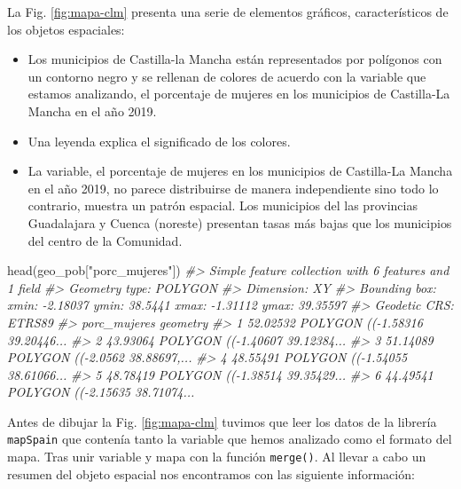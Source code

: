 \documentclass[
]{book}
\newenvironment{Shaded}{\begin{snugshade}}{\end{snugshade}}
\newcommand{\CommentTok}[1]{\textcolor[rgb]{0.56,0.35,0.01}{\textit{#1}}}
\newcommand{\FunctionTok}[1]{\textcolor[rgb]{0.00,0.00,0.00}{#1}}
\newcommand{\NormalTok}[1]{#1}
\newcommand{\StringTok}[1]{\textcolor[rgb]{0.31,0.60,0.02}{#1}}
\begin{document}
La Fig. \ref{fig:mapa-clm} presenta una serie de elementos gráficos,
característicos de los objetos espaciales:

\begin{itemize}
\item
  Los municipios de Castilla-la Mancha están representados por polígonos con
  un contorno negro y se rellenan de colores de acuerdo con la variable que
  estamos analizando, el porcentaje de mujeres en los municipios de
  Castilla-La Mancha en el año 2019.
\item
  Una leyenda explica el significado de los colores.
\item
  La variable, el porcentaje de mujeres en los municipios de Castilla-La
  Mancha en el año 2019, no parece distribuirse de manera independiente sino
  todo lo contrario, muestra un patrón espacial. Los municipios del las
  provincias Guadalajara y Cuenca (noreste) presentan tasas más bajas que los
  municipios del centro de la Comunidad.
\end{itemize}

\begin{Shaded}
\begin{Highlighting}[]
\FunctionTok{head}\NormalTok{(geo\_pob[}\StringTok{"porc\_mujeres"}\NormalTok{])}
\CommentTok{\#\textgreater{} Simple feature collection with 6 features and 1 field}
\CommentTok{\#\textgreater{} Geometry type: POLYGON}
\CommentTok{\#\textgreater{} Dimension:     XY}
\CommentTok{\#\textgreater{} Bounding box:  xmin: {-}2.18037 ymin: 38.5441 xmax: {-}1.31112 ymax: 39.35597}
\CommentTok{\#\textgreater{} Geodetic CRS:  ETRS89}
\CommentTok{\#\textgreater{}   porc\_mujeres                       geometry}
\CommentTok{\#\textgreater{} 1     52.02532 POLYGON (({-}1.58316 39.20446...}
\CommentTok{\#\textgreater{} 2     43.93064 POLYGON (({-}1.40607 39.12384...}
\CommentTok{\#\textgreater{} 3     51.14089 POLYGON (({-}2.0562 38.88697,...}
\CommentTok{\#\textgreater{} 4     48.55491 POLYGON (({-}1.54055 38.61066...}
\CommentTok{\#\textgreater{} 5     48.78419 POLYGON (({-}1.38514 39.35429...}
\CommentTok{\#\textgreater{} 6     44.49541 POLYGON (({-}2.15635 38.71074...}
\end{Highlighting}
\end{Shaded}

Antes de dibujar la Fig. \ref{fig:mapa-clm} tuvimos que leer los datos de la
librería \texttt{mapSpain} \citep{rmapspain} que contenía tanto la variable que hemos
analizado como el formato del mapa. Tras unir variable y mapa con la función
\texttt{merge()}. Al llevar a cabo un resumen del objeto espacial nos encontramos con
las siguiente información:
\end{document}
